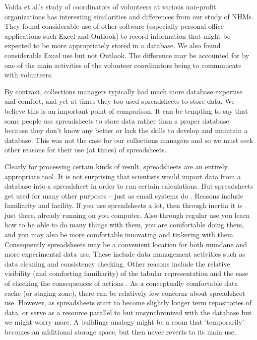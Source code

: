 Voida et al.'s study of coordinators of volunteers at various non-profit organizations \cite{voida2011homebrew} has interesting similarities and differences from our study of NHMs. They found considerable use of other software (especially personal office applications such Excel and Outlook) to record information that might be expected to be more appropriately stored in a database. We also found considerable Excel use but not Outlook. The difference may be accounted for by one of the main activities of the volunteer coordinators being to communicate with volunteers. 

By contrast, collections managers typically had much more database expertise and comfort, and yet at times they too used spreadsheets to store data. We believe this is an important point of comparison. It can be tempting to say that some people use spreadsheets to store data rather than a proper database because they don't know any better or lack the skills to develop and maintain a database. This was not the case for our collections managers and so we must seek other reasons for their use (at times) of spreadsheets.

Clearly for processing certain kinds of result, spreadsheets are an entirely appropriate tool. It is not surprising that scientists would import data from a database into a spreadsheet in order to run certain calculations. But spreadsheets get used for many other purposes – just as email systems do \cite{bellotti2005quality}. Reasons include familiarity and facility. If you use spreadsheets a lot, then through inertia it is just there, already running on you computer. Also through regular use you learn how to be able to do many things with them, you are comfortable doing them, and you may also be more comfortable innovating and tinkering with them.  Consequently spreadsheets may be a convenient location for both mundane and more experimental data use. These include data management activities such as data cleaning and consistency checking.  Other reasons include the relative visibility (and comforting familiarity) of the tabular representation and the ease of checking the consequences of actions \cite{nardi1991twinkling}. As a conceptually comfortable data cache (or staging zone), there can be relatively few concerns about spreadsheet use. However, as spreadsheets start to become slightly longer term repositories of data, or serve as a resource parallel to but unsynchronized with the database but  we might worry more. A buildings analogy might be a room that 'temporarily' becomes an additional storage space, but then never reverts to its main use.


